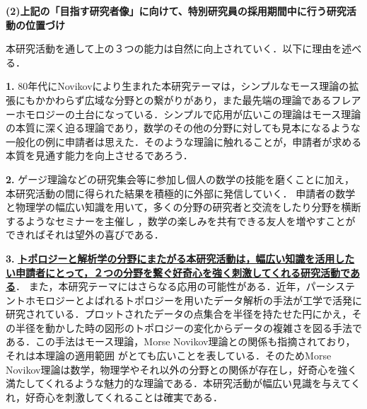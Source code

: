 \documentclass[11pt,a4j,dvipdfmx]{jarticle} 					%
\newcommand{\研究課題名}{象の卵}
\newcommand{\研究機関名}{京都大学}
\newcommand{\研究代表者氏名}{福士　謙二　　　}
\begin{document}

\vspace{5mm}
\noindent
\textbf{(2)上記の「目指す研究者像」に向けて、特別研究員の採用期間中に行う研究活動の位置づけ}



本研究活動を通して上の３つの能力は自然に向上されていく．以下に理由を述べる．


\noindent\textbf{1. }80年代にNovikovにより生まれた本研究テーマは，シンプルなモース理論の拡張にもかかわらず広域な分野との繋がりがあり，また最先端の理論であるフレアーホモロジーの土台になっている．シンプルで応用が広いこの理論はモース理論の本質に深く迫る理論であり，数学のその他の分野に対しても見本になるような一般化の例に申請者は思えた．そのような理論に触れることが，申請者が求める本質を見通す能力を向上させるであろう．


\noindent\textbf{2. }ゲージ理論などの研究集会等に参加し個人の数学の技能を磨くことに加え，本研究活動の間に得られた結果を積極的に外部に発信していく．
申請者の数学と物理学の幅広い知識を用いて，多くの分野の研究者と交流をしたり分野を横断するようなセミナーを主催し
，数学の楽しみを共有できる友人を増やすことができればそれは望外の喜びである．


\noindent\textbf{3. }
\textbf{\ul{トポロジーと解析学の分野にまたがる本研究活動は，幅広い知識を活用したい申請者にとって，２つの分野を繋ぐ好奇心を強く刺激してくれる研究活動である}}．
また，本研究テーマにはさらなる応用の可能性がある．近年，パーシステントホモロジーとよばれるトポロジーを用いたデータ解析の手法が工学で活発に研究されている．プロットされたデータの点集合を半径を持たせた円にかえ，その半径を動かした時の図形のトポロジーの変化からデータの複雑さを図る手法である．この手法はモース理論，Morse Novikov理論との関係も指摘されており，それは本理論の適用範囲
がとても広いことを表している．そのためMorse Novikov理論は数学，物理学やそれ以外の分野との関係が存在し，好奇心を強く満たしてくれるような魅力的な理論である．本研究活動が幅広い見識を与えてくれ，好奇心を刺激してくれることは確実である．







\end{document}

